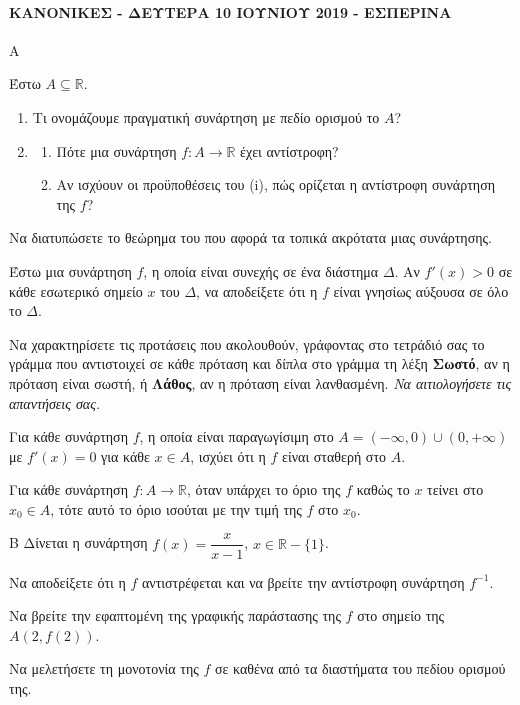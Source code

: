 \paragraph{ΚΑΝΟΝΙΚΕΣ - ΔΕΥΤΕΡΑ 10 ΙΟΥΝΙΟΥ 2019 - ΕΣΠΕΡΙΝΑ}
\begin{thema}{Α}
\begin{erwthma}
    \item Έστω $A \subseteq \mathbb{R}$.
    \begin{enumerate}[label=\alph*)]
        \item Τι ονομάζουμε πραγματική συνάρτηση με πεδίο ορισμού το $A$? 
        \item
        \begin{enumerate}[label=\roman*.]
            \item Πότε μια συνάρτηση $f : A \to \mathbb{R}$ έχει αντίστροφη? 
            \item Αν ισχύουν οι προϋποθέσεις του (i), πώς ορίζεται η αντίστροφη συνάρτηση της $f$? 
        \end{enumerate}
    \end{enumerate}
    \item Να διατυπώσετε το θεώρημα του  που αφορά τα τοπικά ακρότατα μιας συνάρτησης. 
    \item Έστω μια συνάρτηση $f$, η οποία είναι συνεχής σε ένα διάστημα $\Delta$. Αν $f'(x) > 0$ σε κάθε εσωτερικό σημείο $x$ του $\Delta$, να αποδείξετε ότι η $f$ είναι γνησίως αύξουσα σε όλο το $\Delta$. 
    \item Να χαρακτηρίσετε τις προτάσεις που ακολουθούν, γράφοντας στο τετράδιό σας το γράμμα που αντιστοιχεί σε κάθε πρόταση και δίπλα στο γράμμα τη λέξη \textbf{Σωστό}, αν η πρόταση είναι σωστή, ή \textbf{Λάθος}, αν η πρόταση είναι λανθασμένη. \textit{Να αιτιολογήσετε τις απαντήσεις σας.}
    \begin{alist}
        \item Για κάθε συνάρτηση $f$, η οποία είναι παραγωγίσιμη στο $A = (-\infty, 0) \cup (0, +\infty)$ με $f'(x) = 0$ για κάθε $x \in A$, ισχύει ότι η $f$ είναι σταθερή στο $A$.
        \item Για κάθε συνάρτηση $f : A \to \mathbb{R}$, όταν υπάρχει το όριο της $f$ καθώς το $x$ τείνει στο $x_0 \in A$, τότε αυτό το όριο ισούται με την τιμή της $f$ στο $x_0$.
    \end{alist} 
\end{erwthma}
\end{thema}
\begin{thema}{Β}
Δίνεται η συνάρτηση $f(x) = \dfrac{x}{x-1}$, $x \in \mathbb{R} - \{1\}$.
\begin{erwthma}
    \item Να αποδείξετε ότι η $f$ αντιστρέφεται και να βρείτε την αντίστροφη συνάρτηση $f^{-1}$. 
    \item Να βρείτε την εφαπτομένη της γραφικής παράστασης της $f$ στο σημείο της $A(2, f(2))$. 
    \item Να μελετήσετε τη μονοτονία της $f$ σε καθένα από τα διαστήματα του πεδίου ορισμού της. 
\end{erwthma}
\end{thema}

